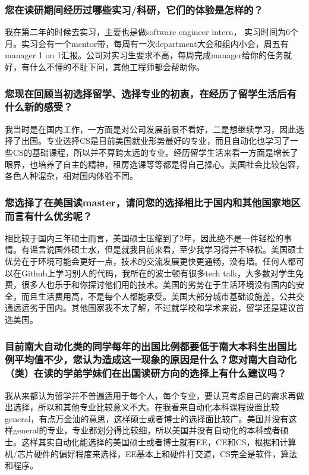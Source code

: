 \documentclass[a4paper,UTF8]{book}
\begin{document}
    \subsubsection*{您在读研期间经历过哪些实习/科研，它们的体验是怎样的？}
    我在第二年的时候去实习，主要也是做software engineer intern， 实习时间为6个月。实习会有一个mentor带，每周有一次department大会和组内小会，周五有manager 1 on 1汇报。公司对实习生要求不高，每周完成manager给你的任务就好，有什么不懂的不耻下问，其他工程师都会帮助你。

    \subsubsection*{您现在回顾当初选择留学、选择专业的初衷，在经历了留学生活后有什么新的感受？}
    我当时是在国内工作，一方面是对公司发展前景不看好，二是想继续学习，因此选择了出国。专业选择CS是目前美国就业形势最好的专业，而且自动化也学习了一些CS的基础课程，所以并不算跨太远的专业。经历留学生活来看一方面是增长了眼界，也培养了自主的精神，租房选课等等都是得自己操心。美国社会比较包容，各色人种混杂，相对国内体验不同。

    \subsubsection*{您选择了在美国读master，请问您的选择相比于国内和其他国家地区而言有什么优劣呢？}
    相比较于国内三年硕士而言，美国硕士压缩到了2年，因此绝不是一件轻松的事情。有谣言说国外硕士水，但是就我目前来看，至少我学习得并不轻松。美国硕士优势在于环境可能会更好一点，技术的交流发展更快更通畅，没有墙。任何人都可以在Github上学习别人的代码，我所在的波士顿有很多tech talk，大多数对学生免费，很多人也乐于和你探讨他们用的技术。美国的劣势在于生活环境没有国内的安全，而且生活费用高，不是每个人都能承受。美国大部分城市基础设施差，公共交通远远劣于国内。其他国家我不太了解，不过就学校和学术来说，留学还是建议首选美国。

    \subsubsection*{目前南大自动化类的同学每年的出国比例都要低于南大本科生出国比例平均值不少，您认为造成这一现象的原因是什么？您对南大自动化（类）在读的学弟学妹们在出国读研方向的选择上有什么建议吗？}
    我从来都认为留学并不普遍适用于每个人，每个专业，要认真考虑自己的需求再做出选择，所以和其他专业比较意义不大。在我看来自动化本科课程设置比较general，有点万金油的意思，这样硕士或者博士的选择面比较广。美国并没有这样general的专业，专业都划分得比较细，所以美国并没有自动化的本科或者硕士。这样其实自动化能选择的美国硕士或者博士就有EE，CE和CS，根据和计算机/芯片硬件的偏好程度来选择，EE基本上和硬件打交道，CS完全是软件，算法和程序。
\end{document}

